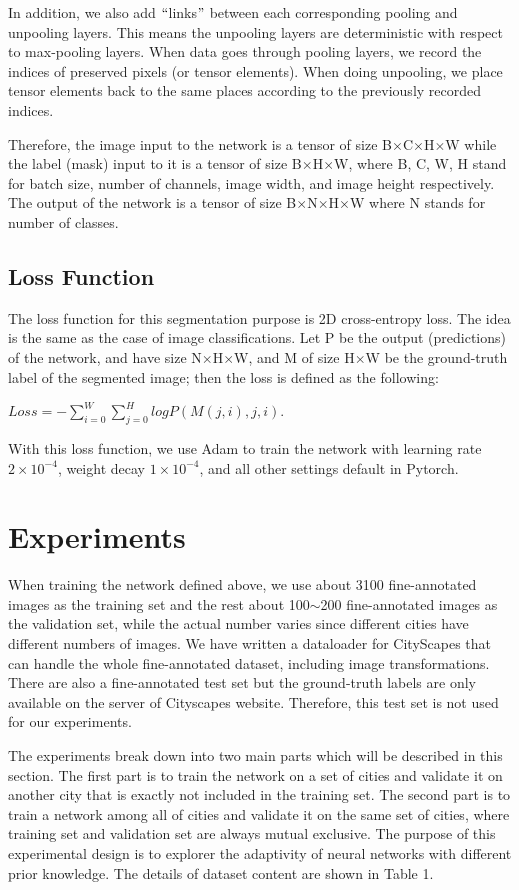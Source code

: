 \documentclass[10pt,twocolumn,letterpaper]{article}
\begin{document}
In addition, we also add $``$links$"$ between each corresponding pooling and unpooling layers. This means the unpooling layers are deterministic with respect to max-pooling layers. When data goes through pooling layers, we record the indices of preserved pixels (or tensor elements). When doing unpooling, we place tensor elements back to the same places according to the previously recorded indices.

Therefore, the image input to the network is a tensor of size B$\times$C$\times$H$\times$W while the label (mask) input to it is a tensor of size B$\times$H$\times$W, where B, C, W, H stand for batch size, number of channels, image width, and image height respectively. The output of the network is a tensor of size B$\times$N$\times$H$\times$W where N stands for number of classes.

\subsection{Loss Function}
The loss function for this segmentation purpose is 2D cross-entropy loss. The idea is the same as the case of image classifications. Let P be the output (predictions) of the network, and have size N$\times$H$\times$W, and M of size H$\times$W be the ground-truth label of the segmented image; then the loss is defined as the following:
\begin{center}
	$Loss = -\sum_{i=0}^{W}\sum_{j=0}^{H}logP(M(j,i),j,i).$
\end{center}
With this loss function, we use Adam to train the network with learning rate $2\times10^{-4}$, weight decay $1\times10^{-4}$, and all other settings default in Pytorch.

\section{Experiments}
When training the network defined above, we use about 3100 fine-annotated images as the training set and the rest about 100$\sim$200 fine-annotated images as the validation set, while the actual number varies since different cities have different numbers of images. We have written a dataloader for CityScapes that can handle the whole fine-annotated dataset, including image transformations. There are also a fine-annotated test set but the ground-truth labels are only available on the server of Cityscapes website. Therefore, this test set is not used for our experiments.

The experiments break down into two main parts which will be described in this section. The first part is to train the network on a set of cities and validate it on another city that is exactly not included in the training set. The second part is to train a network among all of cities and validate it on the same set of cities, where training set and validation set are always mutual exclusive. The purpose of this experimental design is to explorer the adaptivity of neural networks with different prior knowledge. The details of dataset content are shown in Table 1.
\end{document}
